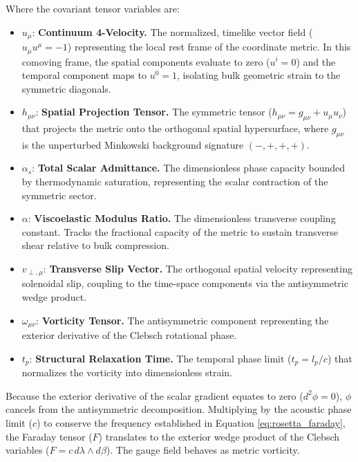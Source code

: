 Where the covariant tensor variables are:
    \begin{itemize}[noitemsep]
    \item $u_\mu$: \textbf{Continuum 4-Velocity.} The normalized, timelike vector field ($u_\mu u^\mu = -1$) representing the local rest frame of the coordinate metric. In this comoving frame, the spatial components evaluate to zero ($u^i = 0$) and the temporal component maps to $u^0 = 1$, isolating bulk geometric strain to the symmetric diagonals. 
    \item $h_{\mu\nu}$: \textbf{Spatial Projection Tensor.} The symmetric tensor ($h_{\mu\nu} = g_{\mu\nu} + u_\mu u_\nu$) that projects the metric onto the orthogonal spatial hypersurface, where $g_{\mu\nu}$ is the unperturbed Minkowski background signature $(-,+,+,+)$.
    \item $\alpha_s$: \textbf{Total Scalar Admittance.} The dimensionless phase capacity bounded by thermodynamic saturation, representing the scalar contraction of the symmetric sector. 
    \item $\alpha$: \textbf{Viscoelastic Modulus Ratio.} The dimensionless transverse coupling constant. Tracks the fractional capacity of the metric to sustain transverse shear relative to bulk compression. 
    \item $v_{\perp, \mu}$: \textbf{Transverse Slip Vector.} The orthogonal spatial velocity representing solenoidal slip, coupling to the time-space components via the antisymmetric wedge product.
    \item $\omega_{\mu\nu}$: \textbf{Vorticity Tensor.} The antisymmetric component representing the exterior derivative of the Clebsch rotational phase.
    \item $t_p$: \textbf{Structural Relaxation Time.} The temporal phase limit ($t_p = l_p/c$) that normalizes the vorticity into dimensionless strain.
\end{itemize}

Because the exterior derivative of the scalar gradient equates to zero ($d^2\phi = 0$), $\phi$ cancels from the antisymmetric decomposition. Multiplying by the acoustic phase limit ($c$) to conserve the frequency established in Equation \ref{eq:rosetta_faraday}, the Faraday tensor ($F$) translates to the exterior wedge product of the Clebsch variables ($F = c \, d\lambda \wedge d\beta$). The gauge field behaves as metric vorticity. %

